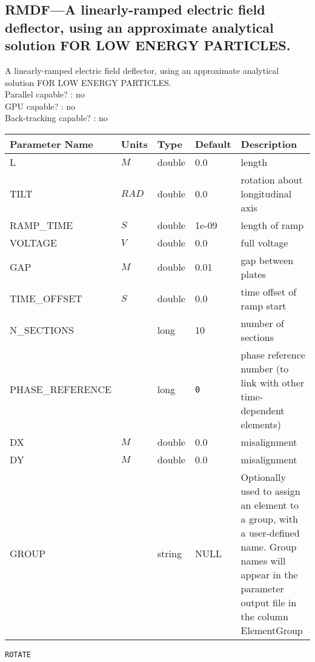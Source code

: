 \subsection{RMDF---A linearly-ramped electric field deflector, using an approximate analytical solution FOR LOW ENERGY PARTICLES.}
A linearly-ramped electric field deflector, using an approximate analytical solution FOR LOW ENERGY PARTICLES.
\\
Parallel capable? : no\\
GPU capable? : no\\
Back-tracking capable? : no\\
\begin{tabular}{|l|l|l|l|p{\descwidth}|} \hline
Parameter Name & Units & Type & Default & Description \\ \hline 
L & $M$ & double &  0.0 & length  \\ \hline 
TILT & $RAD$ & double &  0.0 & rotation about longitudinal axis  \\ \hline 
RAMP\_TIME & $S$ & double &   1e-09 & length of ramp  \\ \hline 
VOLTAGE & $V$ & double &  0.0 & full voltage  \\ \hline 
GAP & $M$ & double &   0.01 & gap between plates  \\ \hline 
TIME\_OFFSET & $S$ & double &  0.0 & time offset of ramp start  \\ \hline 
N\_SECTIONS &  & long &   10              & number of sections  \\ \hline 
PHASE\_REFERENCE &  & long &  \verb|0| & phase reference number (to link with other time-dependent elements)  \\ \hline 
DX & $M$ & double &  0.0 & misalignment  \\ \hline 
DY & $M$ & double &  0.0 & misalignment  \\ \hline 
GROUP &  & string & NULL & Optionally used to assign an element to a group, with a user-defined name.  Group names will appear in the parameter output file in the column ElementGroup  \\ \hline 
\end{tabular}

\newpage
\begin{center}{\Large\verb|ROTATE|}\end{center}
